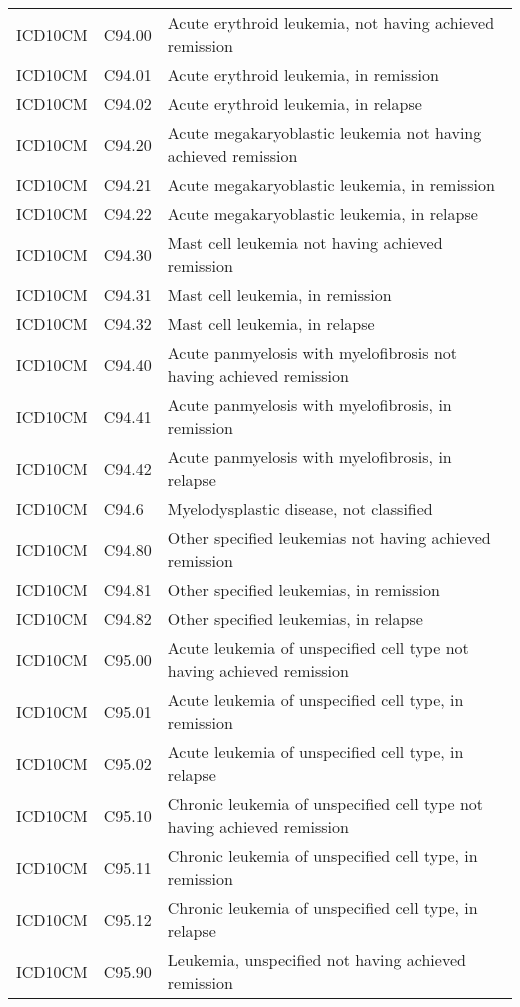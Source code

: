 \begin{longtable}{p{}p{}p{}}
  ICD10CM & C94.00 & Acute erythroid leukemia, not having achieved remission \\ 
  ICD10CM & C94.01 & Acute erythroid leukemia, in remission \\ 
  ICD10CM & C94.02 & Acute erythroid leukemia, in relapse \\ 
  ICD10CM & C94.20 & Acute megakaryoblastic leukemia not having achieved remission \\ 
  ICD10CM & C94.21 & Acute megakaryoblastic leukemia, in remission \\ 
  ICD10CM & C94.22 & Acute megakaryoblastic leukemia, in relapse \\ 
  ICD10CM & C94.30 & Mast cell leukemia not having achieved remission \\ 
  ICD10CM & C94.31 & Mast cell leukemia, in remission \\ 
  ICD10CM & C94.32 & Mast cell leukemia, in relapse \\ 
  ICD10CM & C94.40 & Acute panmyelosis with myelofibrosis not having achieved remission \\ 
  ICD10CM & C94.41 & Acute panmyelosis with myelofibrosis, in remission \\ 
  ICD10CM & C94.42 & Acute panmyelosis with myelofibrosis, in relapse \\ 
  ICD10CM & C94.6 & Myelodysplastic disease, not classified \\ 
  ICD10CM & C94.80 & Other specified leukemias not having achieved remission \\ 
  ICD10CM & C94.81 & Other specified leukemias, in remission \\ 
  ICD10CM & C94.82 & Other specified leukemias, in relapse \\ 
  ICD10CM & C95.00 & Acute leukemia of unspecified cell type not having achieved remission \\ 
  ICD10CM & C95.01 & Acute leukemia of unspecified cell type, in remission \\ 
  ICD10CM & C95.02 & Acute leukemia of unspecified cell type, in relapse \\ 
  ICD10CM & C95.10 & Chronic leukemia of unspecified cell type not having achieved remission \\ 
  ICD10CM & C95.11 & Chronic leukemia of unspecified cell type, in remission \\ 
  ICD10CM & C95.12 & Chronic leukemia of unspecified cell type, in relapse \\ 
  ICD10CM & C95.90 & Leukemia, unspecified not having achieved remission \\ 

\end{longtable}
